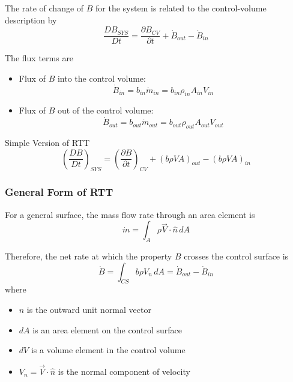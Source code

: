 The rate of change of $B$ for the system is related to the control-volume description by
\begin{equation}
    \frac{D B_{SYS}}{Dt}
    =
    \frac{\partial B_{CV}}{\partial t}
    +
    \dot{B}_{out}
    -
    \dot{B}_{in}
\end{equation}

The flux terms are
\begin{itemize}
    \item Flux of $B$ into the control volume:
    \begin{equation}
        \dot{B}_{in}=b_{in}\dot{m}_{in}=b_{in}\rho_{in}A_{in}V_{in}
    \end{equation}

    \item Flux of $B$ out of the control volume:
    \begin{equation}
        \dot{B}_{out}=b_{out}\dot{m}_{out}=b_{out}\rho_{out}A_{out}V_{out}
    \end{equation}
\end{itemize}

\begin{mainbox}{Simple Version of RTT}
\begin{equation*}
    \left(\frac{DB}{Dt}\right)_{SYS}
    =
    \left(\frac{\partial B}{\partial t}\right)_{CV}
    +
    (b\rho VA)_{out}
    -
    (b\rho VA)_{in}
\end{equation*}
\end{mainbox}

\subsubsection{General Form of RTT}

For a general surface, the mass flow rate through an area element is
\begin{equation}
    \dot{m}=\int_A \rho \vec{V}\cdot\hat{n}\,dA
\end{equation}

Therefore, the net rate at which the property $B$ crosses the control surface is
\begin{equation}
    \dot{B}
    =
    \int_{CS} b\rho V_n\,dA
    =
    \dot{B}_{out}-\dot{B}_{in}
\end{equation}
where
\begin{itemize}
    \item $\hat{n}$ is the outward unit normal vector
    \item $dA$ is an area element on the control surface
    \item $dV$ is a volume element in the control volume
    \item $V_n=\vec{V}\cdot\hat{n}$ is the normal component of velocity
\end{itemize}

